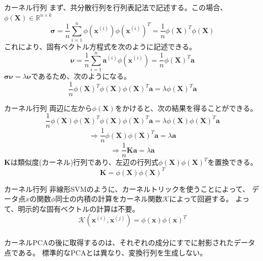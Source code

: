 \documentclass[aspectratio=169, dvipdfmx, 11pt]{beamer} %
\begin{document}
\begin{frame}{カーネル行列}
    まず、共分散行列を行列表記法で記述する。この場合、\(\phi(\bm{X}) \in \mathbb{R}^{n \times k} \)
    \begin{equation*}
        \bm{\sigma} = \frac{1}{n} \sum_{i=1}^{n} \phi(\bm{x}^{(i)}) \phi(\bm{x}^{(i)})^T = 
        \frac{1}{n} \phi(\bm{X})^T \phi(\bm{X})
    \end{equation*}
    これにより、固有ベクトル方程式を次のように記述できる。
    \begin{equation*}
        \bm{\nu} = \frac{1}{n} \sum_{i=1}^{n} \bm{a}^{(i)} \phi(\bm{x}^{(i)})
        = \frac{1}{n} \phi(\bm{X})^T \bm{a} 
    \end{equation*}
    \(\bm{\sigma} \bm{\nu}  = \lambda \bm{\nu} \)であるため、次のようになる。
    \begin{equation*}
        \frac{1}{n} \phi(\bm{X})^T \phi(\bm{X}) \phi(\bm{X})^T \bm{a}  = \lambda \phi(\bm{X})^T \bm{a} 
    \end{equation*}
\end{frame}

\begin{frame}{カーネル行列}
    両辺に左から\(\phi(\bm{X})\)をかけると、次の結果を得ることができる。
    \begin{equation*}
        \frac{1}{n} \phi(\bm{X}) \phi(\bm{X})^T \phi(\bm{X}) \phi(\bm{X})^T \bm{a}  = \lambda \phi(\bm{X}) \phi(\bm{X})^T \bm{a} 
    \end{equation*}
    \begin{equation*}
        \Rightarrow \frac{1}{n} \phi(\bm{X}) \phi(\bm{X})^T \bm{a}  = \lambda \bm{a} 
    \end{equation*}
    \begin{equation*}
        \Rightarrow \frac{1}{n} \bm{K} \bm{a}  = \lambda \bm{a} 
    \end{equation*}
    \(\bm{K}\)は類似度(カーネル)行列であり、左辺の行列式\(\phi(\bm{X}) \phi(\bm{X})^T\)を置換できる。
    \begin{equation*}
        \bm{K} = \phi(\bm{X}) \phi(\bm{X})^T
    \end{equation*}
\end{frame}

\begin{frame}{カーネル行列}
    非線形SVMのように、カーネルトリックを使うことによって、
    データ点\(x\)の関数\(\phi\)同士の内積の計算をカーネル関数\(\mathcal{K}\)によって回避する。
    よって、明示的な固有ベクトルの計算は不要。\\
    \vspace{1em}
    \begin{equation*}
        \mathcal{K}(\bm{x}^{(i)}, \bm{x}^{(j)}) = \phi(\bm{x}) \phi(\bm{x})^T
    \end{equation*}
    \vspace{1em}\\
    カーネルPCAの後に取得するのは、それぞれの成分にすでに射影されたデータ点である。
    標準的なPCAとは異なり、変換行列を生成しない。
\end{frame}
\end{document}
